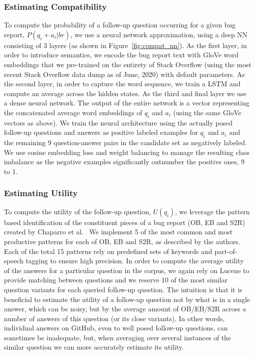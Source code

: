 \subsubsection{Estimating Compatibility}
To compute the probability of a follow-up question occurring for a given bug report, $P(q_{i}+a_{i}|br)$, we use a neural
network approximation, using a deep NN consisting of 3 layers (as shown in Figure~\ref{fig:compat_nn}). As the first layer,
in order to introduce semantics, we encode the bug report text with GloVe word embeddings that we pre-trained on the entirety of Stack Overflow (using the most recent Stack Overflow data dump as of June, 2020) with default parameters. As the second layer, in order to capture the word sequence, we train a LSTM and compute an average across the hidden states. As the third and final layer we use a dense neural network. The output of the entire network is a vector representing the concatenated average word embeddings of $q_{i}$ and $a_{i}$ (using the same GloVe vectors as above). We train the neural architecture using the actually posed follow-up questions and answers as positive labeled examples for $q_{i}$ and $a_{i}$ and the remaining 9 question-answer pairs in the candidate set as negatively labeled. We use cosine embedding loss and weight balancing to manage the resulting class imbalance as the negative examples significantly outnumber the positive ones, 9 to 1.

\subsubsection{Estimating Utility}
To compute the utility of the follow-up question, $U(q_{i})$, we leverage the pattern based
identification of the constituent pieces of a bug report (OB, EB and S2R) created by Chaparro et al.~\cite{chaparro17detecting}
We implement 5 of the most common and most productive patterns for each of OB, EB and S2R, as described by
the authors. Each of the total 15 patterns rely on predefined sets of keywords and part-of-speech tagging to ensure high
precision. In order to compute the average utility of the answers for a particular question in the corpus, we again rely on Lucene to provide
matching between questions and we reserve 10 of the most similar question variants for each queried follow-up question. The intuition is that it is beneficial to estimate the utility of a follow-up question not by what is in a single answer, which can be noisy, but by the average amount of OB/EB/S2R across a number of answers of this question (or its close variants). In other words, individual answers on GitHub, even to well posed follow-up questions, can sometimes be inadequate, but, when averaging over several instances of the similar question we can more accurately estimate its utility.


%
%
%
